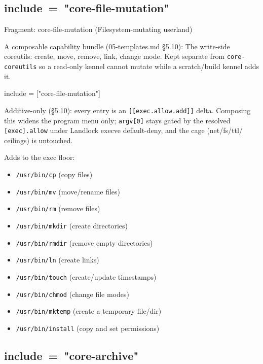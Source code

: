 \hypertarget{include-core-file-mutation}{%
\subsection{\texorpdfstring{include\ =\ "core-file-mutation"}{include = "core-file-mutation"}}\label{include-core-file-mutation}}

Fragment: core-file-mutation (Filesystem-mutating userland)

A composable capability bundle (05-templates.md §5.10): The write-side
coreutils: create, move, remove, link, change mode. Kept separate from
\texttt{core-coreutils} so a read-only kennel cannot mutate while a
scratch/build kennel adds it.

\begin{kennelcode}
include = ["core-file-mutation"]
\end{kennelcode}

Additive-only (§5.10): every entry is an
\texttt{{[}{[}exec.allow.add{]}{]}} delta. Composing this widens the
program menu only; \texttt{argv{[}0{]}} stays gated by the resolved
\texttt{{[}exec{]}.allow} under Landlock execve default-deny, and the
cage (net/fs/ttl/ ceilings) is untouched.

Adds to the exec floor:

\begin{itemize}
\tightlist
\item
  \texttt{/usr/bin/cp} (copy files)
\item
  \texttt{/usr/bin/mv} (move/rename files)
\item
  \texttt{/usr/bin/rm} (remove files)
\item
  \texttt{/usr/bin/mkdir} (create directories)
\item
  \texttt{/usr/bin/rmdir} (remove empty directories)
\item
  \texttt{/usr/bin/ln} (create links)
\item
  \texttt{/usr/bin/touch} (create/update timestamps)
\item
  \texttt{/usr/bin/chmod} (change file modes)
\item
  \texttt{/usr/bin/mktemp} (create a temporary file/dir)
\item
  \texttt{/usr/bin/install} (copy and set permissions)
\end{itemize}

\hypertarget{include-core-archive}{%
\subsection{\texorpdfstring{include\ =\ "core-archive"}{include = "core-archive"}}\label{include-core-archive}}

